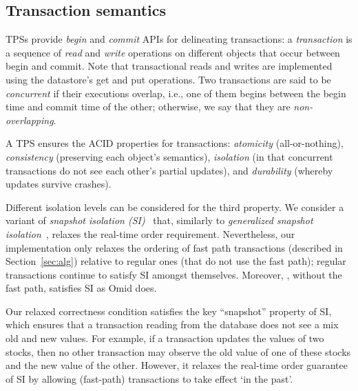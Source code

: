 \noindent
{

\subsection{Transaction semantics} \label{ssec:transactions}

TPSs provide \emph{begin} and \emph{commit} APIs for delineating transactions: 
a \emph{transaction} is a sequence of \emph{read} and \emph{write} operations on different objects 
that occur between begin and commit. {}
Note that transactional reads and writes are implemented using the 
datastore's get and put operations.
Two transactions are said to be \emph{concurrent} if 
their executions overlap, i.e., one of them begins between the begin time and commit time of the other;
otherwise, we say that they are \emph{non-overlapping}.

A TPS  ensures the ACID properties for transactions:
\emph{atomicity} (all-or-nothing), \emph{consistency} (preserving each object's semantics), 
\emph{isolation} (in that concurrent transactions do not see each other's partial updates), and 
\emph{durability} (whereby updates survive crashes).

Different isolation levels can be considered for the third property. We consider a variant of 
\emph{snapshot isolation (SI)}~\cite{DBLP:conf/sigmod/BerensonBGMOO95} that, similarly to \emph{generalized snapshot isolation}~\cite{DBLP:conf/srds/ElniketyZP05}, relaxes  the real-time order requirement. 
Nevertheless, our implementation only relaxes the ordering of fast path  transactions (described in Section~\ref{sec:alg}) 
relative to regular ones (that do not use the fast path); regular transactions continue to satisfy SI amongst themselves. 
Moreover, \sysll, without the fast path, satisfies SI as Omid does.

Our relaxed correctness condition satisfies the key ``snapshot'' property of SI, which ensures that a transaction reading from the  database
does not see a mix old and new values. For example, if a transaction updates the values of two stocks, 
then no other transaction may observe the old value of one of these stocks and the new value of the other.
However, it relaxes the real-time order guarantee of SI by allowing (fast-path) transactions to take effect `in the past'.  
 }
